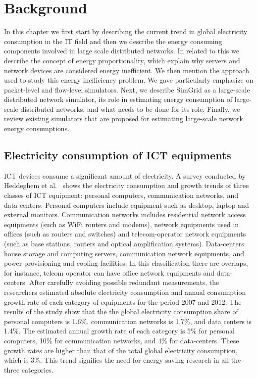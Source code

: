 \chapter{Background}
\label{chapter:background} 
In this chapter we first start by describing the current trend in global electricity consumption in the IT field and then we describe the energy consuming components involved in large scale distributed networks. In related to this we describe the concept of energy proportionality, which explain why servers and network devices are considered energy inefficient. We then mention the approach used to study this energy inefficiency problem. We gave particularly emphasize on packet-level and flow-level simulators. Next, we describe SimGrid as a large-scale distributed network simulator, its role in estimating energy consumption of large-scale distributed networks, and what needs to be done for its role. Finally, we review existing simulators that are proposed for estimating large-scale network energy consumptions.
\section{Electricity consumption of ICT equipments}
\label{section:ictequipment} 
ICT devices consume a significant amount of electricity. A survey conducted by Heddeghem et al.{\ }\cite{DBLP:journals/comcom/HeddeghemLLCPD14} shows the electricity consumption and growth trends of three classes of ICT equipment: personal computers, communication networks, and data centers. Personal computers include equipment such as desktop, laptop and external monitors. Communication networks includes residential network access equipments (such as WiFi routers and modems), network equipments used in offices (such as routers and switches) and telecom-operator network equipments (such as base stations, routers and optical amplification systems). Data-centers house storage and computing servers, communication network equipments, and power provisioning and cooling facilities.  In this classification there are overlaps, for instance, telcom operator can have office network equipments and data-centers. After carefully avoiding possible redundant measurements, the researchers estimated absolute electricity consumption and annual consumption growth rate of each category of equipments for the period 2007 and 2012. The results of the study show that the  the global electricity consumption share of personal computers is 1.6\%, communication networks is 1.7\%, and data centers is 1.4\%. The estimated annual growth rate of each category is 5\% for personal computers, 10\% for communication networks, and 4\% for data-centers. These growth rates are higher than that of the total global electricity consumption, which is 3\%. This trend signifies the need for energy saving research in all the three categories.
